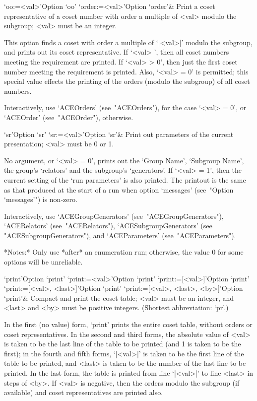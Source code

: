 \>`oo:=<val>'{Option `oo'}
\>`order:=<val>'{Option `order'}&
Print a coset representative of a coset number with order  a  multiple
of <val> modulo the subgroup; <val> must be an integer.

This option finds a coset with order a multiple  of  `|<val>|'  modulo
the subgroup, and prints out its coset representative.  If  `<val>  ', then all coset numbers meeting the  requirement  are  printed.  If
`<val> > 0', then just the first coset number meeting the  requirement
is printed. Also, `<val> = 0' is permitted; this special value effects
the printing of the orders (modulo the subgroup) of all coset numbers.

Interactively, use `ACEOrders' (see~"ACEOrders"), for the case  `<val>
= 0', or `ACEOrder' (see~"ACEOrder"), otherwise.

\>`sr'{Option `sr'}
\>`sr:=<val>'{Option `sr'}&
Print out parameters of the current presentation; <val> must be  0  or
1.

No argument, or `<val> = 0', prints out the  `Group  Name',  `Subgroup
Name', the group's `relators'  and  the  subgroup's  `generators'.  If
`<val> = 1', then the current setting of the \lq{}run  parameters'  is
also printed. The printout is the same as that produced at  the  start
of a run when option `messages' (see~"Option `messages'") is non-zero.

Interactively,  use  `ACEGroupGenerators'  (see~"ACEGroupGenerators"),
`ACERelators'   (see~"ACERelators"),   `ACESubgroupGenerators'    (see
"ACESubgroupGenerators"), and `ACEParameters' (see~"ACEParameters").

*Notes:*
Only use *after* an enumeration run; otherwise, the value 0  for  some
options will be unreliable.

\>`print'{Option `print'}
\>`print:=<val>'{Option `print'}
\>`print:=[<val>]'{Option `print'}
\>`print:=[<val>, <last>]'{Option `print'}
\>`print:=[<val>, <last>, <by>]'{Option `print'}&
Compact and print the coset table;  <val>  must  be  an  integer,  and
<last> and <by> must be positive integers.
(Shortest abbreviation: `pr'.)

In the first (no value) form, `print' prints the entire  coset  table,
without orders or coset  representatives.  In  the  second  and  third
forms, the absolute value of <val> is taken to be the last line of the
table to be printed (and 1 is taken to be the first);  in  the  fourth
and fifth forms, `|<val>|' is taken to be the first line of the  table
to be printed, and <last> is taken to be the number of the  last  line
to be printed. In the last  form,  the  table  is  printed  from  line
`|<val>|' to line <last> in steps of <by>. If <val> is negative,  then
the  orders   modulo   the   subgroup   (if   available)   and   coset
representatives are printed also.

